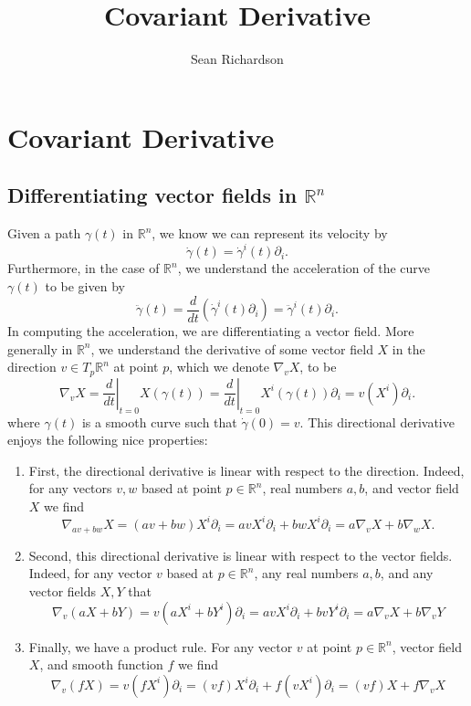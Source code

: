 \documentclass[
]{article}
\title{Covariant Derivative}
\author{Sean Richardson}
\date{}
\providecommand{\tightlist}{%
  \setlength{\itemsep}{0pt}\setlength{\parskip}{0pt}}
\begin{document}
\maketitle

\hypertarget{covariant-derivative}{%
\section{Covariant Derivative}\label{covariant-derivative}}

\hypertarget{differentiating-vector-fields-in-mathbbrn}{%
\subsection{\texorpdfstring{Differentiating vector fields in
\(\mathbb{R}^n\)}{Differentiating vector fields in \textbackslash mathbb\{R\}\^{}n}}\label{differentiating-vector-fields-in-mathbbrn}}

Given a path \(\gamma(t)\) in \(\mathbb{R}^n\), we know we can represent
its velocity by \[
    \dot{\gamma}(t) = \dot{\gamma}^i(t) \partial_i.
\] Furthermore, in the case of \(\mathbb{R}^n\), we understand the
acceleration of the curve \(\gamma(t)\) to be given by \[
    \ddot{\gamma}(t) = \frac{d }{d t}\left(\dot{\gamma}^i(t) \partial_i\right) = \ddot{\gamma}^i(t) \partial_i.
\] In computing the acceleration, we are differentiating a vector field.
More generally in \(\mathbb{R}^n\), we understand the derivative of some
vector field \(X\) in the direction \(v \in T_p\mathbb{R}^n\) at point
\(p\), which we denote \(\nabla_v X\), to be \[
    \nabla_v X = \left.\frac{d }{d t}\right|_{t=0}X(\gamma(t)) = \left.\frac{d }{d t}\right|_{t=0}X^i(\gamma(t))\partial_i = v(X^i)\partial_i.
\] where \(\gamma(t)\) is a smooth curve such that
\(\dot{\gamma}(0) = v\). This directional derivative enjoys the
following nice properties:

\begin{enumerate}
\def\labelenumi{\arabic{enumi}.}
\tightlist
\item
  First, the directional derivative is linear with respect to the
  direction. Indeed, for any vectors \(v,w\) based at point
  \(p \in \mathbb{R}^n\), real numbers \(a,b\), and vector field \(X\)
  we find \[
   \nabla_{av + bw}X
   = (av + bw)X^i \partial_i
   = avX^i\partial_i + bwX^i\partial_i
   = a\nabla_vX + b\nabla_wX.
  \]
\item
  Second, this directional derivative is linear with respect to the
  vector fields. Indeed, for any vector \(v\) based at
  \(p \in \mathbb{R}^n\), any real numbers \(a,b\), and any vector
  fields \(X,Y\) that \[
   \nabla_v(aX + bY)
   = v(aX^i + bY^i)\partial_i
   = avX^i\partial_i + bvY^i\partial_i
   = a\nabla_vX + b\nabla_vY
  \]
\item
  Finally, we have a product rule. For any vector \(v\) at point
  \(p \in \mathbb{R}^n\), vector field \(X\), and smooth function \(f\)
  we find \[
   \nabla_v(fX)
   = v(fX^i)\partial_i
   = (vf)X^i\partial_i + f(vX^i)\partial_i
   = (vf)X + f\nabla_vX
  \]
\end{enumerate}
\end{document}

